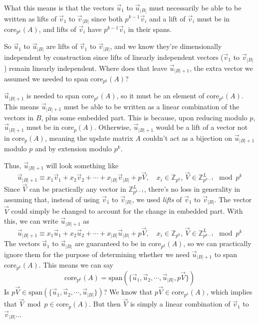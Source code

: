 \documentclass[a4paper, reqno, 12pt]{amsart}
\newcommand\core[2]{\text{core}_{#1}(#2)}
\newcommand\vecspan[1]{\text{span}(#1)}
\begin{document}
	What this means is that the vectors $\vec{u}_1$ to $\vec{u}_{|B|}$ must necessarily be able to be written as lifts of $\vec{v}_1$ to $\vec{v}_{|B|}$ since both
	$p^{k-1}\vec{v}_i$ and a lift of $\vec{v}_i$ must be in $\core{p^k}{A}$, and lifts of $\vec{v}_i$ have $p^{k-1}\vec{v}_i$ in their spans.
	
	So $\vec{u}_1$ to $\vec{u}_{|B|}$ are lifts of $\vec{v}_1$ to $\vec{v}_{|B|}$, and we know they're dimensionally independent by construction since lifts of
	linearly independent vectors ($\vec{v}_1$ to $\vec{v}_{|B|}$) remain linearly independent. Where does that leave $\vec{u}_{|B|+1}$, the extra vector we
	assumed we needed to span $\core{p^k}{A}$?
	
	$\vec{u}_{|B|+1}$ is needed to span $\core{p^k}{A}$, so it must be an element of $\core{p^k}{A}$. This means $\vec{u}_{|B|+1}$ must be able
	to be written as a linear combination of the vectors in $B$, plus some embedded part. This is because, upon reducing modulo $p$, $\vec{u}_{|B|+1}$ must be in
	$\core{p}{A}$. Otherwise, $\vec{u}_{|B|+1}$ would be a lift of a vector not in $\core{p}{A}$, meaning the update matrix $A$ couldn't act as a bijection on
	$\vec{u}_{|B|+1}$ modulo $p$ and by extension modulo $p^k$.
	
	Thus, $\vec{u}_{|B|+1}$ will look something like
	\[
		\vec{u}_{|B|+1} \equiv x_1\vec{v}_1 + x_2\vec{v}_2 + \cdots + x_{|B|}\vec{v}_{|B|} + p\vec{V}, 
		\quad x_i \in \mathds{Z}_{p^k}, \, \vec{V} \in \mathds{Z}_{p^{k-1}}^{L} \mod{p^k}
	\]
	Since $\vec{V}$ can be practically any vector in $\mathds{Z}_{p^{k-1}}^L$, there's no loss in generality in assuming that, instead of using $\vec{v}_1$
	to $\vec{v}_{|B|}$, we used \emph{lifts} of $\vec{v}_1$ to $\vec{v}_{|B|}$. The vector $\vec{V}$ could simply be changed to account for the change in embedded
	part. With this, we can write $\vec{u}_{|B|+1}$ as
	\[
		\vec{u}_{|B|+1} \equiv x_1\vec{u}_1 + x_2\vec{u}_2 + \cdots + x_{|B|}\vec{u}_{|B|} + p\vec{V}, 
		\quad x_i \in \mathds{Z}_{p^k}, \, \vec{V} \in \mathds{Z}_{p^{k-1}}^{L} \mod{p^k}
	\]
	The vectors $\vec{u}_1$ to $\vec{u}_{|B|}$ are guaranteed to be in $\core{p^k}{A}$, so we can practically ignore them for the purpose of determining whether
	we need $\vec{u}_{|B|+1}$ to span $\core{p^k}{A}$. This means we can say
	\[
		\core{p^k}{A} = \vecspan{\{\vec{u}_1, \vec{u}_2, \cdots, \vec{u}_{|B|}, p\vec{V}\}}
	\]
	Is $p\vec{V} \in \vecspan{\{\vec{u}_1, \vec{u}_2, \cdots, \vec{u}_{|B|}\}}$? We know that $p\vec{V} \in \core{p^k}{A}$, which implies that 
	$\vec{V} \bmod{p} \in \core{p}{A}$. But then $\vec{V}$ is simply a linear combination of $\vec{v}_1$ to $\vec{v}_{|B|}$...
	
	
	
\end{document}
